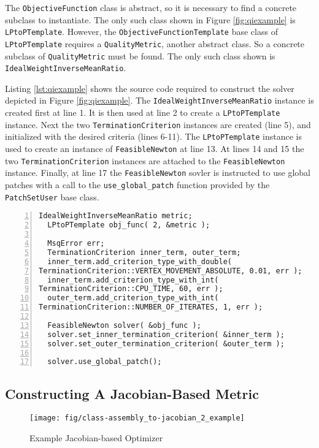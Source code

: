 \documentclass{article}
\begin{document}
The \texttt{ObjectiveFunction} class is abstract, so it is necessary to find a concrete subclass to instantiate.  The only such class shown in Figure \ref{fig:qiexample} is \texttt{LPtoPTemplate}.  However, the \texttt{ObjectiveFunctionTemplate} base class of \texttt{LPtoPTemplate} requires a \texttt{QualityMetric}, another abstract class.  So a concrete subclass of \texttt{QualityMetric} must be found.  The only such class shown is \texttt{IdealWeightInverseMeanRatio}.

Listing \ref{lst:qiexample} shows the source code required to construct the solver depicted in Figure \ref{fig:qiexample}.  The \texttt{IdealWeightInverseMeanRatio} instance is created first at line 1.  It is then used at line 2 to create a \texttt{LPtoPTemplate} instance.  Next the two \texttt{TerminationCriterion} instances are created (line 5), and initialized with the desired criteria (lines 6-11).  The \texttt{LPtoPTemplate} instance is used to create an instance of \texttt{FeasibleNewton} at line 13.  At lines 14 and 15 the two \texttt{TerminationCriterion} instances are attached to the \texttt{FeasibleNewton} instance.  Finally, at line 17 the \texttt{FeasibleNewton} sovler is instructed to use global patches with a call to the \texttt{use\_global\_patch} function provided by the \texttt{PatchSetUser} base class.

\begin{lstlisting}[caption={Example Quality Improver},label={lst:qiexample},numbers=left]
  IdealWeightInverseMeanRatio metric;
  LPtoPTemplate obj_func( 2, &metric );

  MsqError err;
  TerminationCriterion inner_term, outer_term;
  inner_term.add_criterion_type_with_double(
TerminationCriterion::VERTEX_MOVEMENT_ABSOLUTE, 0.01, err );
  inner_term.add_criterion_type_with_int(
TerminationCriterion::CPU_TIME, 60, err );
  outer_term.add_criterion_type_with_int(
TerminationCriterion::NUMBER_OF_ITERATES, 1, err );

  FeasibleNewton solver( &obj_func );
  solver.set_inner_termination_criterion( &inner_term );
  solver.set_outer_termination_criterion( &outer_term );

  solver.use_global_patch();
\end{lstlisting}

\subsection{Constructing A Jacobian-Based Metric}


\begin{figure}[p]
\begin{center}
\texttt{[image: fig/class-assembly\_to-jacobian\_2\_example]}
\caption{Example Jacobian-based Optimizer\label{fig:jacobianex}}
\end{center}
\end{figure}
\end{document}
